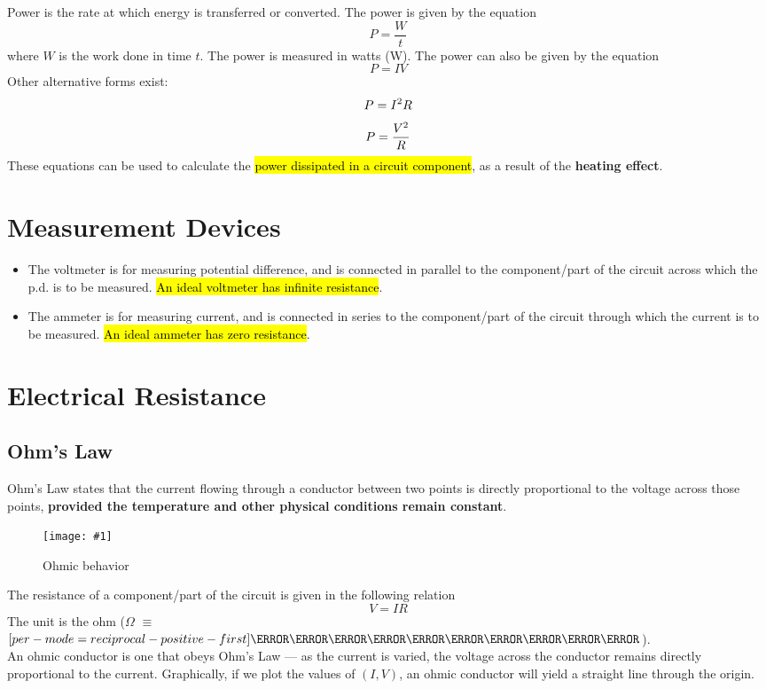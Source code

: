 \documentclass[a4paper,12pt]{article}
\let\oldsection\section
\renewcommand\section{\clearpage\oldsection}
\let\oldsi\si
\renewcommand{\si}[1]{\oldsi[per-mode=reciprocal-positive-first]{#1}}
\newcommand{\lb}{\\[8pt]}
\newcommand{\img}[4]{\begin{center}
  \begin{figure}[H]
    \centering
    \texttt{[image: \#1]}
    \caption{#3}
    \label{fig:#4}
  \end{figure}
\end{center}}
\begin{document}
Power is the rate at which energy is transferred or converted. The power is given by the equation \begin{equation}
  P = \frac{W}{t}
\end{equation}where $W$ is the work done in time $t$. The power is measured in watts (W). The power can also be given by the equation $$P = IV$$
Other alternative forms exist:
\begin{equation}
  P = I^2R \\
\end{equation}
\begin{equation}
  P = \frac{V^2}{R} \\
\end{equation}
These equations can be used to calculate the \hl{power dissipated in a circuit component}, as a result of the \textbf{heating effect}.

\section{Measurement Devices}

\begin{itemize}
  \item The voltmeter is for measuring potential difference, and is connected in parallel to the component/part of the circuit across which the p.d. is to be measured. \hl{An ideal voltmeter has infinite resistance}.
  \item The ammeter is for measuring current, and is connected in series to the component/part of the circuit through which the current is to be measured. \hl{An ideal ammeter has zero resistance}.
\end{itemize}

\section{Electrical Resistance}

\subsection{Ohm's Law}

Ohm's Law states that the current flowing through a conductor between two points is directly proportional to the voltage across those points, \textbf{provided the temperature and other physical conditions remain constant}.
\img{ohmic.png}{0.7}{Ohmic behavior}{ohm}
The resistance of a component/part of the circuit is given in the following relation
\begin{equation}
  V = IR
\end{equation}
The unit is the ohm ($\Omega$ $\equiv$ $\si{\kilo\g\m\squared\per\s\cubed\per\A\squared}$).\lb
An ohmic conductor is one that obeys Ohm's Law --- as the current is varied, the voltage across the conductor remains directly proportional to the current. Graphically, if we plot the values of $(I, V)$, an ohmic conductor will yield a straight line through the origin.
\end{document}
